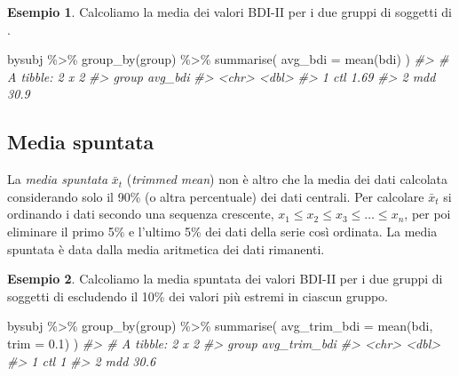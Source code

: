 \documentclass[
  11pt,
  italian,
  a4paper,
  extrafontsizes,onecolumn,openright
  ]{memoir}
\newenvironment{Shaded}{\begin{snugshade}}{\end{snugshade}}
\newcommand{\AttributeTok}[1]{\textcolor[rgb]{0.77,0.63,0.00}{#1}}
\newcommand{\CommentTok}[1]{\textcolor[rgb]{0.56,0.35,0.01}{\textit{#1}}}
\newcommand{\FloatTok}[1]{\textcolor[rgb]{0.00,0.00,0.81}{#1}}
\newcommand{\FunctionTok}[1]{\textcolor[rgb]{0.00,0.00,0.00}{#1}}
\newcommand{\NormalTok}[1]{#1}
\newcommand{\SpecialCharTok}[1]{\textcolor[rgb]{0.00,0.00,0.00}{#1}}
\theoremstyle{definition}
\theoremstyle{definition}
\newtheorem{example}{Esempio}[chapter]
\theoremstyle{definition}
\theoremstyle{definition}
\theoremstyle{remark}
\begin{document}
\begin{example}

Calcoliamo la media dei valori BDI-II per i due gruppi di soggetti di \textcite{zetschefuture2019}.

\begin{Shaded}
\begin{Highlighting}[]
\NormalTok{bysubj }\SpecialCharTok{\%\textgreater{}\%} 
  \FunctionTok{group\_by}\NormalTok{(group) }\SpecialCharTok{\%\textgreater{}\%} 
  \FunctionTok{summarise}\NormalTok{(}
    \AttributeTok{avg\_bdi =} \FunctionTok{mean}\NormalTok{(bdi)}
\NormalTok{  ) }
\CommentTok{\#\textgreater{} \# A tibble: 2 x 2}
\CommentTok{\#\textgreater{}   group avg\_bdi}
\CommentTok{\#\textgreater{}   \textless{}chr\textgreater{}   \textless{}dbl\textgreater{}}
\CommentTok{\#\textgreater{} 1 ctl      1.69}
\CommentTok{\#\textgreater{} 2 mdd     30.9}
\end{Highlighting}
\end{Shaded}

\end{example}

\hypertarget{media-spuntata}{%
\subsection{Media spuntata}\label{media-spuntata}}

La \emph{media spuntata} \(\bar{x}_t\) (\emph{trimmed mean}) non è altro che la
media dei dati calcolata considerando solo il 90\% (o altra percentuale)
dei dati centrali. Per calcolare \(\bar{x}_t\) si ordinando i dati secondo
una sequenza crescente, \(x_1 \leq x_2 \leq x_3 \leq \dots \leq x_n\), per
poi eliminare il primo 5\% e l'ultimo 5\% dei dati della serie così
ordinata. La media spuntata è data dalla media aritmetica dei dati rimanenti.

\begin{example}

Calcoliamo la media spuntata dei valori BDI-II per i due gruppi di soggetti di \textcite{zetschefuture2019} escludendo il 10\% dei valori più estremi in ciascun gruppo.

\begin{Shaded}
\begin{Highlighting}[]
\NormalTok{bysubj }\SpecialCharTok{\%\textgreater{}\%} 
  \FunctionTok{group\_by}\NormalTok{(group) }\SpecialCharTok{\%\textgreater{}\%} 
  \FunctionTok{summarise}\NormalTok{(}
    \AttributeTok{avg\_trim\_bdi =} \FunctionTok{mean}\NormalTok{(bdi, }\AttributeTok{trim =} \FloatTok{0.1}\NormalTok{)}
\NormalTok{  ) }
\CommentTok{\#\textgreater{} \# A tibble: 2 x 2}
\CommentTok{\#\textgreater{}   group avg\_trim\_bdi}
\CommentTok{\#\textgreater{}   \textless{}chr\textgreater{}        \textless{}dbl\textgreater{}}
\CommentTok{\#\textgreater{} 1 ctl            1  }
\CommentTok{\#\textgreater{} 2 mdd           30.6}
\end{Highlighting}
\end{Shaded}

\end{example}
\end{document}
